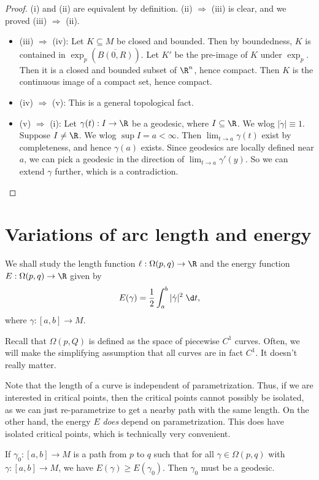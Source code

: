 \documentclass[a4paper]{article}
\begin{document}
\begin{proof}
  (i) and (ii) are equivalent by definition. (ii) $\Rightarrow$ (iii) is clear, and we proved (iii) $\Rightarrow$ (ii).

  \begin{itemize}
    \item (iii) $\Rightarrow$ (iv): Let $K \subseteq M$ be closed and bounded. Then by boundedness, $K$ is contained in $\exp_p(\overline{B(0, R)})$. Let $K'$ be the pre-image of $K$ under $\exp_p$. Then it is a closed and bounded subset of $\R^n$, hence compact. Then $K$ is the continuous image of a compact set, hence compact.
    \item (iv) $\Rightarrow$ (v): This is a general topological fact.
    \item (v) $\Rightarrow$ (i): Let $\gamma(t): I \to \R$ be a geodesic, where $I \subseteq \R$. We wlog $|\dot{\gamma}| \equiv 1$. Suppose $I \not= \R$. We wlog $\sup I = a < \infty$. Then $\lim_{t \to a} \gamma(t)$ exist by completeness, and hence $\gamma(a)$ exists. Since geodesics are locally defined near $a$, we can pick a geodesic in the direction of $\lim_{t \to a} \gamma'(y)$. So we can extend $\gamma$ further, which is a contradiction.
  \end{itemize}
\end{proof}

\section{Variations of arc length and energy}
We shall study the length function $\ell: \Omega(p, q) \to \R$ and the energy function $E: \Omega(p, q) \to \R$ given by
\[
  E(\gamma) = \frac{1}{2} \int_a^b|\dot{\gamma}|^2\;\d t,
\]
where $\gamma: [a, b] \to M$.

Recall that $\Omega(p, Q)$ is defined as the space of piecewise $C^1$ curves. Often, we will make the simplifying assumption that all curves are in fact $C^1$. It doesn't really matter.

Note that the length of a curve is independent of parametrization. Thus, if we are interested in critical points, then the critical points cannot possibly be isolated, as we can just re-parametrize to get a nearby path with the same length. On the other hand, the energy $E$ \emph{does} depend on parametrization. This does have isolated critical points, which is technically very convenient.

\begin{prop}
  If $\gamma_0: [a, b] \to M$ is a path from $p$ to $q$ such that for all $\gamma \in \Omega(p, q)$ with $\gamma:[a, b] \to M$, we have $E(\gamma) \geq E(\gamma_0)$. Then $\gamma_0$ must be a geodesic.
\end{prop}
\end{document}
